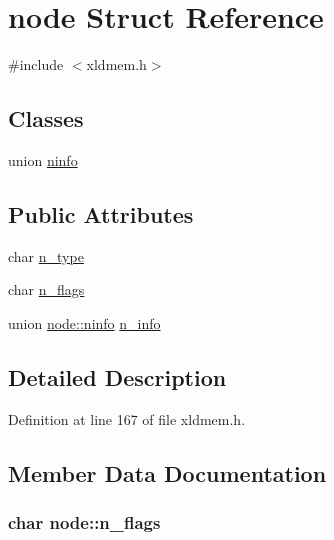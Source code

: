 \hypertarget{structnode}{}\section{node Struct Reference}
\label{structnode}


{\ttfamily \#include $<$xldmem.\+h$>$}

\subsection*{Classes}
\begin{DoxyCompactItemize}
\item 
union \hyperlink{unionnode_1_1ninfo}{ninfo}
\end{DoxyCompactItemize}
\subsection*{Public Attributes}
\begin{DoxyCompactItemize}
\item 
char \hyperlink{structnode_a9a20fdd75eea7d876b803d1dfb92d615}{n\+\_\+type}
\item 
char \hyperlink{structnode_ac81d583095b2e2478da867628381812f}{n\+\_\+flags}
\item 
union \hyperlink{unionnode_1_1ninfo}{node\+::ninfo} \hyperlink{structnode_a9050597940b4b0e6b42b704d5b4f3bab}{n\+\_\+info}
\end{DoxyCompactItemize}


\subsection{Detailed Description}


Definition at line 167 of file xldmem.\+h.



\subsection{Member Data Documentation}
\subsubsection[{\texorpdfstring{n\+\_\+flags}{n_flags}}]{\setlength{\rightskip}{0pt plus 5cm}char node\+::n\+\_\+flags}\hypertarget{structnode_ac81d583095b2e2478da867628381812f}{}\label{structnode_ac81d583095b2e2478da867628381812f}


